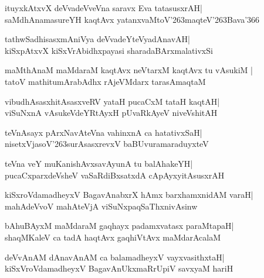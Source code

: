 \documentclass[twoside,12pt,openright]{book}
\def\S{\char'263}
\newcounter{shloka}[chapter]
\begin{document}
\begin{shloka}%
ituyxkAtxvX deVvadeVveVna saravx Eva tatasusxrAH|\\
saMdhAnamasureYH kaqtAvx yatanxvaMtoV\S maqteV\S Bava\char'366
\end{shloka}

\begin{shloka}%
tathwSadhisasxmAniVya deVvadeYteVyadAnavAH|\\
kiSxpAtxvX kiSxVrAbidhxpayasi sharadaBArxmalativxSi
\end{shloka}

\begin{shloka}%
maMthAnaM maMdaraM kaqtAvx neVtarxM kaqtAvx tu vAsukiM |\\
tatoV mathitumArabAdhx rAjeVMdarx tarasAmaqtaM
\end{shloka}

\begin{shloka}%
vibudhAsasxhitAsasxveRV yataH pucaCxM tataH kaqtAH|\\
viSuNxnA vAsukeVdeYRtAyxH pUvaRkAyeV niveVshitAH
\end{shloka}

\begin{shloka}%
teVnAsayx pArxNavAteVna vahinxnA ca hatativxSaH|\\
nisetxVjasoV\S surAsasxrevxV baBUvuramaraduyxteV
\end{shloka}

\begin{shloka}%
teVna veY muKanishAvxsavAyunA tu balAhakeYH|\\
pucaCxparxdeVsheV vaSaRdiBxsatxdA cApAyxyitAsusxrAH
\end{shloka}

\begin{shloka}%
kiSxroVdamadheyxV BagavAnabxrX hAmx barxhamxnidAM varaH|\\
mahAdeVvoV mahAteVjA viSuNxpaqSaThxnivAsinw
\end{shloka}

\begin{shloka}%
bAhuBAyxM maMdaraM gaqhayx padamxvatasx paraMtapaH|\\
shaqMKaleV ca tadA haqtAvx gaqhiVtAvx maMdarAcalaM
\end{shloka}

\begin{shloka}%
deVvAnAM dAnavAnAM ca balamadheyxV vayxvasithxtaH|\\
kiSxVroVdamadheyxV BagavAnUkxmaRrUpiV savxyaM hariH
\end{shloka}
\end{document}

